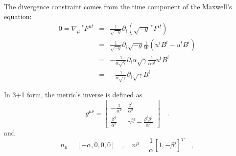 \documentclass[11pt,preprint]{aastex}
\newcommand{\beq}[1]{\begin{equation} #1 \end{equation}}
\newcommand{\beqa}[1]{\begin{eqnarray} #1 \end{eqnarray}}
\newcommand{\maxwell}[2]{{\,}^*\!F^{#1 #2}}
\begin{document}
The divergence constraint comes from the time component of the Maxwell's equation:
\beqa{
0=\nabla_\mu  \maxwell{\mu}{t}  & = & \frac{1}{\sqrt{-g}} \partial_i \left( \sqrt{-g}  \maxwell{i}{t} \right)  \\
& = & \frac{1}{\sqrt{-g}}  \partial_i \sqrt{-g} \frac{1}{W} \left( u^i B^t - u^t B^i \right)  \\
& = & - \frac{1}{\alpha \sqrt{\gamma}} \partial_i \alpha \sqrt{\gamma} \frac{1}{\alpha u^t} u^t B^i  \\
& = & - \frac{1}{\alpha \sqrt{\gamma}} \partial_i \sqrt{\gamma} B^i  
}

In 3+1 form, the metric's inverse is defined as 
\beq{
g^{\mu \nu} = \left[ 
\begin{array}{cc} -\frac{1}{\alpha^2} &\frac{\beta^i}{\alpha^2} \\[0.25cm]
\frac{\beta^j}{\alpha^2}  & \gamma^{i j} - \frac{\beta^i \beta^j}{\alpha^2}
\end{array} \right] \quad .
\label{inverse-metric}
}
and 
\beq{
n_\mu = \left[-\alpha,0,0,0\right] \quad , \quad 
n^\mu = \frac{1}{\alpha} \left[1,-\beta^j\right]^T \quad , \label{normal-observer}
}

%   
%   
\end{document}
